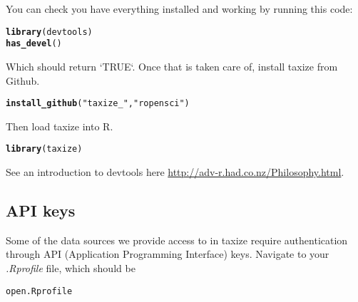 \documentclass[letterpaper,superscriptaddress,showkeys,longbibliography]{revtex4-1}\usepackage[]{graphicx}\usepackage[]{color}
\makeatletter
\newcommand{\hlstr}[1]{\textcolor[rgb]{0.192,0.494,0.8}{#1}}%
\newcommand{\hlstd}[1]{\textcolor[rgb]{0.345,0.345,0.345}{#1}}%
\newcommand{\hlkwd}[1]{\textcolor[rgb]{0.737,0.353,0.396}{\textbf{#1}}}%
\newenvironment{kframe}{%
 \def\at@end@of@kframe{}%
 \ifinner\ifhmode%
  \def\at@end@of@kframe{\end{minipage}}%
  \begin{minipage}{\columnwidth}%
 \fi\fi%
 \def\FrameCommand##1{\hskip\@totalleftmargin \hskip-\fboxsep
 \colorbox{shadecolor}{##1}\hskip-\fboxsep
     \hskip-\linewidth \hskip-\@totalleftmargin \hskip\columnwidth}%
 \MakeFramed {\advance\hsize-\width
   \@totalleftmargin\z@ \linewidth\hsize
   \@setminipage}}%
 {\par\unskip\endMakeFramed%
 \at@end@of@kframe}
\newenvironment{knitrout}{}{} %
\makeatother
\begin{document}
You can check you have everything installed and working by running this code:

\begin{knitrout}
\color{fgcolor}\begin{kframe}
\begin{alltt}
\hlkwd{library}\hlstd{(devtools)}
\hlkwd{has_devel}\hlstd{()}
\end{alltt}
\end{kframe}
\end{knitrout}


Which should return `TRUE`.
Once that is taken care of, install taxize from Github.

\begin{knitrout}
\color{fgcolor}\begin{kframe}
\begin{alltt}
\hlkwd{install_github}\hlstd{(}\hlstr{"taxize_"}\hlstd{,} \hlstr{"ropensci"}\hlstd{)}
\end{alltt}
\end{kframe}
\end{knitrout}


Then load taxize into R.

\begin{knitrout}
\color{fgcolor}\begin{kframe}
\begin{alltt}
\hlkwd{library}\hlstd{(taxize)}
\end{alltt}
\end{kframe}
\end{knitrout}


See an introduction to devtools here \url{http://adv-r.had.co.nz/Philosophy.html}.

\subsection*{API keys}

Some of the data sources we provide access to in taxize require authentication through API (Application Programming Interface) keys. Navigate to your \emph{.Rprofile} file, which should be 

\begin{knitrout}
\color{fgcolor}\begin{kframe}
\begin{alltt}
open .Rprofile
\end{alltt}
\end{kframe}
\end{knitrout}
\end{document}
